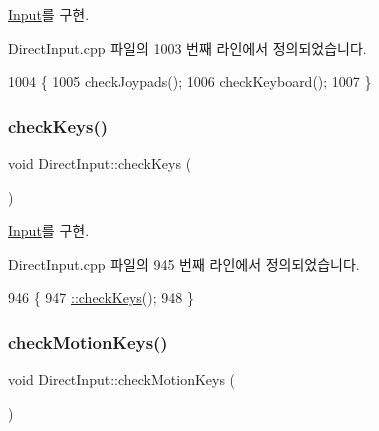 \mbox{\hyperlink{class_input_a7a6ef57ff2638f545380618b2d3fdf9d}{Input}}를 구현.



Direct\+Input.\+cpp 파일의 1003 번째 라인에서 정의되었습니다.


\begin{DoxyCode}
1004 \{
1005     checkJoypads();
1006     checkKeyboard();
1007 \}
\end{DoxyCode}
\mbox{\label{class_direct_input_acecffb99132b93e827373a3683ce342b}} 
\subsubsection{\texorpdfstring{check\+Keys()}{checkKeys()}}
{\footnotesize\ttfamily void Direct\+Input\+::check\+Keys (\begin{DoxyParamCaption}{ }\end{DoxyParamCaption})\hspace{0.3cm}{\ttfamily [virtual]}}



\mbox{\hyperlink{class_input_a91418a5762e6e50aa4f59e4ce92d2dfa}{Input}}를 구현.



Direct\+Input.\+cpp 파일의 945 번째 라인에서 정의되었습니다.


\begin{DoxyCode}
946 \{
947     \mbox{\hyperlink{class_direct_input_acecffb99132b93e827373a3683ce342b}{::checkKeys}}();
948 \}
\end{DoxyCode}
\mbox{\label{class_direct_input_a6e54dc09ff20e12dfe98a24607172c34}} 
\subsubsection{\texorpdfstring{check\+Motion\+Keys()}{checkMotionKeys()}}
{\footnotesize\ttfamily void Direct\+Input\+::check\+Motion\+Keys (\begin{DoxyParamCaption}{ }\end{DoxyParamCaption})\hspace{0.3cm}{\ttfamily [virtual]}}



